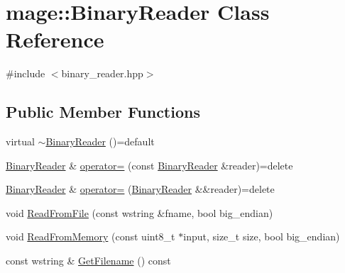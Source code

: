 \hypertarget{classmage_1_1_binary_reader}{}\section{mage\+:\+:Binary\+Reader Class Reference}
\label{classmage_1_1_binary_reader}


{\ttfamily \#include $<$binary\+\_\+reader.\+hpp$>$}

\subsection*{Public Member Functions}
\begin{DoxyCompactItemize}
\item 
virtual \hyperlink{classmage_1_1_binary_reader_aa300382cfa1585bb2f76c4e764bb5617}{$\sim$\+Binary\+Reader} ()=default
\item 
\hyperlink{classmage_1_1_binary_reader}{Binary\+Reader} \& \hyperlink{classmage_1_1_binary_reader_a0408bb456983b4a03ae42ab69c6f4bc3}{operator=} (const \hyperlink{classmage_1_1_binary_reader}{Binary\+Reader} \&reader)=delete
\item 
\hyperlink{classmage_1_1_binary_reader}{Binary\+Reader} \& \hyperlink{classmage_1_1_binary_reader_abb971fe92727a0e86b3698dba8c586de}{operator=} (\hyperlink{classmage_1_1_binary_reader}{Binary\+Reader} \&\&reader)=delete
\item 
void \hyperlink{classmage_1_1_binary_reader_aa9cc5e2bd41cd5ae5ee421ee9a1e10b2}{Read\+From\+File} (const wstring \&fname, bool big\+\_\+endian)
\item 
void \hyperlink{classmage_1_1_binary_reader_a682fee42662d8b15d2f1c36611554c25}{Read\+From\+Memory} (const uint8\+\_\+t $\ast$input, size\+\_\+t size, bool big\+\_\+endian)
\item 
const wstring \& \hyperlink{classmage_1_1_binary_reader_a10a0ec56fe7f8e63964ffca2afe019a3}{Get\+Filename} () const
\end{DoxyCompactItemize}
